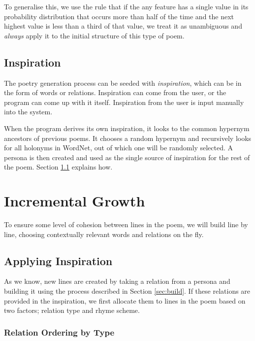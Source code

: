 To generalise this, we use the rule that if the any feature has a single value in its probability distribution that occurs more than half of the time and the next highest value is less than a third of that value, we treat it as unambiguous and \textit{always} apply it to the initial structure of this type of poem.


\subsection{Inspiration}
The poetry generation process can be seeded with \textit{inspiration}, which can be in the form of words or relations. Inspiration can come from the user, or the program can come up with it itself. Inspiration from the user is input manually into the system.

When the program derives its own inspiration, it looks to the common hypernym ancestors of previous poems. It chooses a random hypernym and recursively looks for all holonyms in WordNet, out of which one will be randomly selected. A persona is then created and used as the single source of inspiration for the rest of the poem. Section \ref{sec:apply-inspr} explains how.


\section{Incremental Growth}
\label{sec:inc-growth}
To ensure some level of cohesion between lines in the poem, we will build line by line, choosing contextually relevant words and relations on the fly. 

\subsection{Applying Inspiration}
\label{sec:apply-inspr}
As we know, new lines are created by taking a relation from a persona and building it using the process described in Section \ref{sec:build}. If these relations are provided in the inspiration, we first allocate them to lines in the poem based on two factors; relation type and rhyme scheme.

\subsubsection{Relation Ordering by Type}

